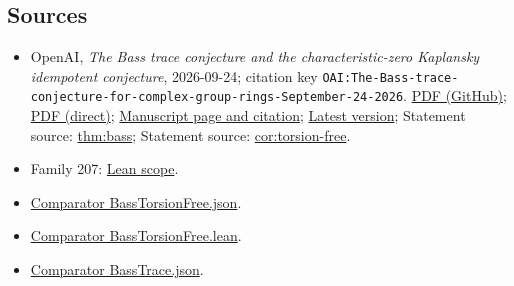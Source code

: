 \documentclass[11pt]{article}
\begin{document}
\subsection{Sources}
\begin{itemize}
\item OpenAI, \emph{The Bass trace conjecture and the characteristic-zero Kaplansky idempotent conjecture}, 2026-09-24; citation key \texttt{OAI:The-Bass-trace-conjecture-for-complex-group-rings-September-24-2026}. \href{https://github.com/openai/math/blob/adc7f1241b42e322a6451854ab7e4b4c146bf78a/preprints/The-Bass-trace-conjecture-for-complex-group-rings-September-24-2026/The-Bass-trace-conjecture-for-complex-group-rings-September-24-2026.pdf}{PDF (GitHub)}; \href{https://github.com/openai/math/raw/adc7f1241b42e322a6451854ab7e4b4c146bf78a/preprints/The-Bass-trace-conjecture-for-complex-group-rings-September-24-2026/The-Bass-trace-conjecture-for-complex-group-rings-September-24-2026.pdf}{PDF (direct)}; \href{https://github.com/openai/math/blob/adc7f1241b42e322a6451854ab7e4b4c146bf78a/preprints/The-Bass-trace-conjecture-for-complex-group-rings-September-24-2026/README.md}{Manuscript page and citation}; \href{https://github.com/openai/math/blob/main/preprints/The-Bass-trace-conjecture-for-complex-group-rings-September-24-2026/The-Bass-trace-conjecture-for-complex-group-rings-September-24-2026.pdf}{Latest version}; Statement source: \href{https://github.com/openai/math/blob/adc7f1241b42e322a6451854ab7e4b4c146bf78a/preprints/The-Bass-trace-conjecture-for-complex-group-rings-September-24-2026/build/sections/01-introduction.tex\#L45}{thm:bass}; Statement source: \href{https://github.com/openai/math/blob/adc7f1241b42e322a6451854ab7e4b4c146bf78a/preprints/The-Bass-trace-conjecture-for-complex-group-rings-September-24-2026/build/sections/01-introduction.tex\#L98}{cor:torsion-free}.
\item Family 207: \href{https://github.com/openai/math/blob/adc7f1241b42e322a6451854ab7e4b4c146bf78a/lean/docs/207.md}{Lean scope}.
\item \href{https://github.com/openai/math/blob/adc7f1241b42e322a6451854ab7e4b4c146bf78a/lean/ComparatorChallenges/BassTorsionFree.json}{Comparator BassTorsionFree.json}.
\item \href{https://github.com/openai/math/blob/adc7f1241b42e322a6451854ab7e4b4c146bf78a/lean/ComparatorChallenges/BassTorsionFree.lean}{Comparator BassTorsionFree.lean}.
\item \href{https://github.com/openai/math/blob/adc7f1241b42e322a6451854ab7e4b4c146bf78a/lean/ComparatorChallenges/BassTrace.json}{Comparator BassTrace.json}.

\end{itemize}
\end{document}
